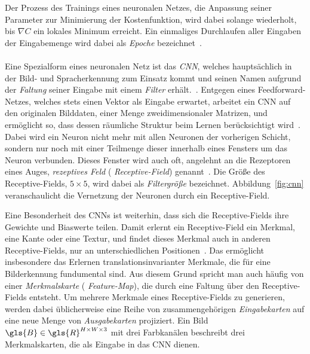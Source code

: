 Der Prozess des Trainings eines neuronalen Netzes, \dhe{} die Anpassung seiner Parameter zur Minimierung der Kostenfunktion, wird dabei solange wiederholt, bis $\nabla C$ ein lokales Minimum erreicht.
Ein einmaliges Durchlaufen aller Eingaben der Eingabemenge wird dabei als \emph{Epoche} bezeichnet~\cite{Nielsen}.
\\\\
Eine Spezialform eines neuronalen Netz ist das \emph{\gls{CNN}}, welches hauptsächlich in der Bild- und Spracherkennung zum Einsatz kommt und seinen Namen aufgrund der \emph{Faltung} seiner Eingabe mit einem \emph{Filter} erhält.~\cite{cnn}.
Entgegen eines Feedforward-Netzes, welches stets einen Vektor als Eingabe erwartet, arbeitet ein \gls{CNN} auf den originalen Bilddaten, \dhe{} einer Menge zweidimensionaler Matrizen, und ermöglicht so, dass dessen räumliche Struktur beim Lernen berücksichtigt wird~\cite{Nielsen}.
Dabei wird ein Neuron nicht mehr mit allen Neuronen der vorherigen Schicht, sondern nur noch mit einer Teilmenge dieser innerhalb eines Fensters um das Neuron verbunden.
Dieses Fenster wird auch oft, angelehnt an die Rezeptoren eines Auges, \emph{rezeptives Feld} (\engl{} \emph{Receptive-Field}) genannt~\cite{cnn}.
Die Größe des Receptive-Fields, \zB{} $5 \times 5$, wird dabei als \emph{Filtergröße} bezeichnet.
Abbildung~\ref{fig:cnn} veranschaulicht die Vernetzung der Neuronen durch ein Receptive-Field.

Eine Besonderheit des \glspl{CNN} ist weiterhin, dass sich die Receptive-Fields ihre Gewichte und Biaswerte teilen.
Damit erlernt ein Receptive-Field ein Merkmal, \zB{} eine Kante oder eine Textur, und findet dieses Merkmal auch in anderen Receptive-Fields, nur an unterschiedlichen Positionen~\cite{Nielsen}.
Das ermöglicht insbesondere das Erlernen translationsinvarianter Merkmale, die für eine Bilderkennung fundumental sind.
Aus diesem Grund spricht man auch häufig von einer \emph{Merkmalskarte} (\engl{} \emph{Feature-Map}), die durch eine Faltung über den Receptive-Fields entsteht.
Um mehrere Merkmale eines Receptive-Fields zu generieren, werden dabei üblicherweise eine Reihe von zusammengehörigen \emph{Eingabekarten} auf eine neue Menge von \emph{Ausgabekarten} projiziert.
Ein Bild $\gls{B} \in \gls{R}^{H \times W \times 3}$ mit drei Farbkanälen beschreibt \zB{} drei Merkmalskarten, die als Eingabe in das \gls{CNN} dienen.

